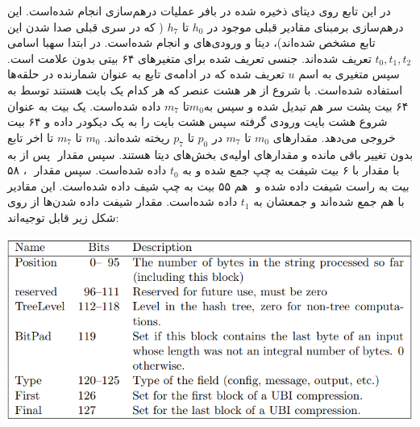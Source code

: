 در این تابع روی دیتای ذخیره شده در بافر عملیات درهم‌سازی انجام شده‌است. این درهم‌سازی برمبنای مقادیر قبلی موجود در $  h_0 $ تا  $ h_7 $ ( که در سری قبلی صدا شدن این تابع مشخص شده‌اند)، دیتا و ورودی‌های  و   انجام شده‌است. 
در ابتدا سهبا اسامی $ t_0 , t_1 , t_2 $ تعریف شده‌اند. جنسی تعریف شده برای متغیرهای ۶۴ بیتی بدون علامت است. سپس متغیری به اسم $ u $ تعریف شده‌ که در ادامه‌ی تابع به عنوان شمارنده در حلقه‌ها استفاده شده‌است. با شروع از  هر هشت عنصر که هر کدام یک بایت هستند توسط  به ۶۴ بیت پشت سر هم تبدیل شده و سپس به$ m_0 $تا $ m_7 $ داده شده‌است.   یک بیت به عنوان شروع هشت بایت ورودی گرفته سپس هشت بایت را به یک دیکودر داده و ۶۴ بیت خروجی می‌دهد. مقدارهای $ m_0 $ تا $ m_7 $ در $ p_0 $ تا $ p_7 $ ریخته شده‌اند. $ m_0 $ تا $ m_7 $ تا اخر تابع بدون تغییر باقی مانده و مقدارهای اولیه‌ی بخش‌های دیتا هستند.  
سپس مقدار ‌ پس از  به با مقدار  با ۶ بیت شیفت به چپ جمع شده و به $ t_0 $ داده شده‌است. سپس مقدار ‌ ، ۵۸ بیت به راست شیفت داده شده و ‌ هم ۵۵ بیت به چپ شیف داده شده‌است. این مقادیر با هم جمع شده‌‌اند و جمعشان به ‌$ t_1 $ داده شده‌است. مقدار شیفت داده شدن‌ها از روی شکل زیر قابل توجیه‌اند:
\begin{center}
	\includegraphics[width=14cm]{images/tweak.png}
\end{center}

